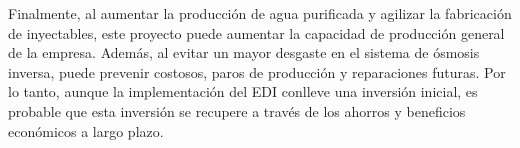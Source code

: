 Finalmente, al aumentar la producción de agua purificada y agilizar la fabricación de inyectables, este proyecto puede aumentar la capacidad de producción general de la empresa. Además, al evitar un mayor desgaste en el sistema de ósmosis inversa, puede prevenir costosos, paros de producción y reparaciones futuras. Por lo tanto, aunque la implementación del EDI conlleve una inversión inicial, es probable que esta inversión se recupere a través de los ahorros y beneficios económicos a largo plazo.












